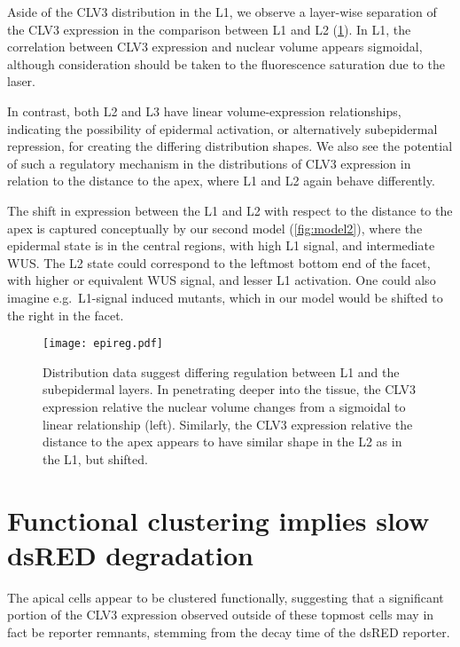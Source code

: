Aside of the CLV3 distribution in the L1, we observe a layer-wise separation of
the CLV3 expression in the comparison between
L1 and L2 (\cref{fig:epireg}). In L1, the correlation between
CLV3 expression and nuclear volume appears sigmoidal, although consideration
should be taken to the fluorescence saturation due to the laser. 

In contrast, both L2 and L3 have linear volume-expression relationships,
indicating the possibility of epidermal  
activation, or alternatively subepidermal repression, for creating the differing
distribution shapes. We also see the potential of such a regulatory mechanism in
the distributions of CLV3 expression in relation to the distance to the apex,
where L1 and L2 again behave differently.

The shift in expression between the L1
and L2 with respect to the  
distance to the apex is captured conceptually by our second model
(\cref{fig:model2}), where the
epidermal state is in the central regions, with high L1 signal, and intermediate
WUS. The L2 state could correspond to the leftmost bottom end of the facet, with
higher or equivalent WUS signal, and lesser L1 activation. One could also
imagine e.g.\ L1-signal induced mutants, which in our model would be shifted to
the right in the facet.

\begin{figure}[H]
  \centering
  \texttt{[image: epireg.pdf]}
  \caption[Cues of epidermal regulation]{Distribution data suggest differing
    regulation between L1 and the subepidermal layers. In penetrating deeper
    into the tissue, the CLV3 expression relative the nuclear volume changes
    from a sigmoidal to linear relationship (left). Similarly, the CLV3
    expression relative the distance to the apex appears to have similar shape
    in the L2 as in the L1,
    but shifted.}
  \label{fig:epireg}
\end{figure}



 \section{Functional clustering implies slow dsRED degradation}
 The apical cells appear to be clustered functionally, suggesting that a
 significant portion of the CLV3 expression observed outside of these topmost
 cells may in fact be reporter remnants, stemming from the decay time of the
 dsRED reporter. 
 
